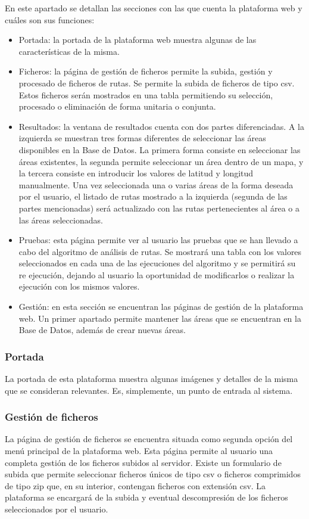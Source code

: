 En este apartado se detallan las secciones con las que cuenta la plataforma web y cuáles son sus funciones:

\begin{itemize}
	\item Portada: la portada de la plataforma web muestra algunas de las características de la misma.
	\item Ficheros: la página de gestión de ficheros permite la subida, gestión y procesado de ficheros de rutas. Se permite la subida de ficheros de tipo csv. Estos ficheros serán mostrados en una tabla permitiendo su selección, procesado o eliminación de forma unitaria o conjunta.
	\item Resultados: la ventana de resultados cuenta con dos partes diferenciadas. A la izquierda se muestran tres formas diferentes de seleccionar las áreas disponibles en la Base de Datos. La primera forma consiste en seleccionar las áreas existentes, la segunda permite seleccionar un área dentro de un mapa, y la tercera consiste en introducir los valores de latitud y longitud manualmente. Una vez seleccionada una o varias áreas de la forma deseada por el usuario, el listado de rutas mostrado a la izquierda (segunda de las partes mencionadas) será actualizado con las rutas pertenecientes al área o a las áreas seleccionadas.
	\item Pruebas: esta página permite ver al usuario las pruebas que se han llevado a cabo del algoritmo de análisis de rutas. Se mostrará una tabla con los valores seleccionados en cada una de las ejecuciones del algoritmo y se permitirá su re ejecución, dejando al usuario la oportunidad de modificarlos o realizar la ejecución con los mismos valores.
	\item Gestión: en esta sección se encuentran las páginas de gestión de la plataforma web. Un primer apartado permite mantener las áreas que se encuentran en la Base de Datos, además de crear nuevas áreas.
\end{itemize}

\subsubsection{Portada}
La portada de esta plataforma muestra algunas imágenes y detalles de la misma que se consideran relevantes. Es, simplemente, un punto de entrada al sistema.

\subsubsection{Gestión de ficheros}
La página de gestión de ficheros se encuentra situada como segunda opción del menú principal de la plataforma web. Esta página permite al usuario una completa gestión de los ficheros subidos al servidor. Existe un formulario de subida que permite seleccionar ficheros únicos de tipo csv o ficheros comprimidos de tipo zip que, en su interior, contengan ficheros con extensión csv. La plataforma se encargará de la subida y eventual descompresión de los ficheros seleccionados por el usuario.

